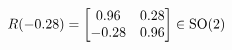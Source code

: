 \documentclass[preview]{standalone}
\begin{document}
\begin{align*}
\special{dvisvgm:raw <g id='unique000'>}R(-0.28) = \begin{bmatrix} 0.96 & 0.28 \\ -0.28 & 0.96 \end{bmatrix} \in \text{SO}(2)\special{dvisvgm:raw </g>}
\end{align*}
\end{document}
